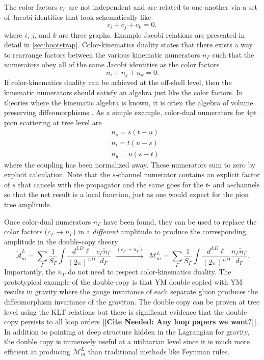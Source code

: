 \documentclass[11pt,letter]{article}
\def\be{\begin{equation}}
\def\ee{\end{equation}}
\newcommand{\citepls}[1]{{\bf\color{red}[[Cite Needed: #1]]}}
\begin{document}
The color factors $c_\Gamma$ are not independent and are related to one another via a set of Jacobi identities that look schematically like
\be
c_i+c_j+c_k=0,
\ee
where $i$, $j$, and $k$ are three graphs.
Example Jacobi relations are presented in detail in \cref{sec:bootstrap}.
Color-kinematics duality states that there exists a way to rearrange factors between the various kinematic numerators $n_\Gamma$ such that the numerators obey all of the same Jacobi identities as the color factors
\be
n_i +n_j +n_k=0.
\ee
If color-kinematics duality can be achieved at the off-shell level, then the kinematic numerators should satisfy an algebra just like the color factors.
In theories where the kinematic algebra is known, it is often the algebra of volume preserving diffeomorphisms \cite{Monteiro2011pc, Ben-Shahar:2021zww, Cheung:2020djz, Cheung:2021zvb, Cheung:2022mix}.
As a simple example, color-dual numerators for 4pt pion scattering at tree level are
\begin{align}
&n_s = s(t-u)\\
&n_t = t(u-s)\\
&n_u = u(s-t)
\end{align}
where the coupling has been normalized away.
These numerators sum to zero by explicit calculation.
Note that the $s$-channel numerator contains an explicit factor of $s$ that cancels with the propagator and the same goes for the $t$- and $u$-channels so that the net result is a local function, just as one would expect for the pion tree amplitude.

Once color-dual numerators $n_\Gamma$ have been found, they can be used to replace the color factors ($c_\Gamma \to n_\Gamma$) in a \emph{different} amplitude to produce the corresponding amplitude in the double-copy theory
\be\label{DCconstruction}
\tilde{\mathcal{A}}_m^L = \sum \limits_\Gamma \frac{1}{S_\Gamma} \int \frac{d^{LD}\ell}{(2\pi)^{LD}} \frac{c_\Gamma \tilde{n}_\Gamma}{d_\Gamma} ~~ \xrightarrow{(c_\Gamma \to n_\Gamma)} ~~ \mathcal{M}_m^L = \sum \limits_\Gamma \frac{1}{S_\Gamma} \int \frac{d^{LD}\ell}{(2\pi)^{LD}} \frac{n_\Gamma \tilde{n}_\Gamma}{d_\Gamma}.
\ee
Importantly, the $\tilde{n}_\Gamma$ do not need to respect color-kinematics duality.
The prototypical example of the double-copy is that YM double copied with YM results in gravity where the gauge invariance of each separate gluon produces the diffeomorphism invariance of the graviton.
The double copy can be proven at tree level using the KLT relations but there is significant evidence that the double copy persists to all loop orders \cite{KLT, KiermaierTalk} \citepls{Any loop papers we want?}.
In addition to pointing at deep structure hidden in the Lagrangian for gravity, the double copy is immensely useful at a utilitarian level since it is much more efficient at producing $\mathcal{M}_m^L$ than traditional methods like Feynman rules.
\end{document}
